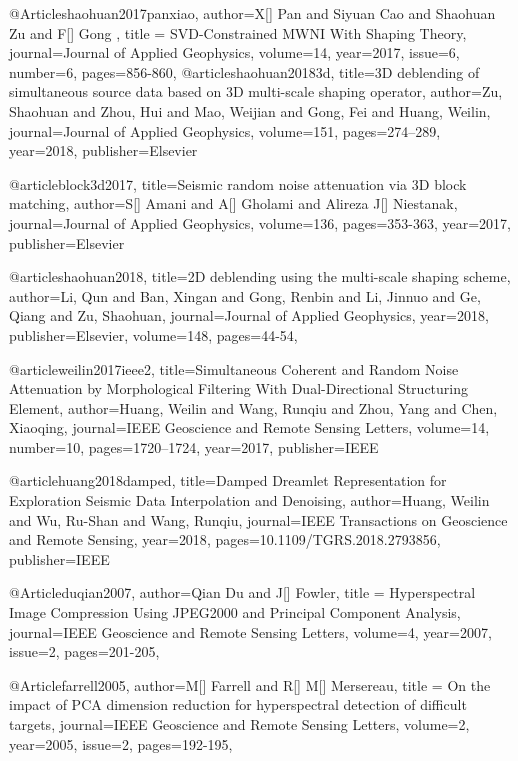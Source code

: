 @Article{shaohuan2017panxiao,
  author={X[] Pan and Siyuan Cao and Shaohuan Zu and F[] Gong },
  title = {SVD-Constrained MWNI With Shaping Theory},
  journal={Journal of Applied Geophysics},
  volume={14},
  year=2017,
  issue=6,
  number=6,
  pages={856-860},
}
@article{shaohuan20183d,
  title={3{D} deblending of simultaneous source data based on 3{D} multi-scale shaping operator},
  author={Zu, Shaohuan and Zhou, Hui and Mao, Weijian and Gong, Fei and Huang, Weilin},
  journal={Journal of Applied Geophysics},
  volume={151},
  pages={274--289},
  year={2018},
  publisher={Elsevier}
}

@article{block3d2017,
  title={Seismic random noise attenuation via 3{D} block matching},
  author={S[] Amani and A[] Gholami and Alireza J[] Niestanak},
  journal={Journal of Applied Geophysics},
  volume={136},
  pages={353-363},
  year={2017},
  publisher={Elsevier}
}






@article{shaohuan2018,
  title={2{D} deblending using the multi-scale shaping scheme},
  author={Li, Qun and Ban, Xingan and Gong, Renbin and Li, Jinnuo and Ge, Qiang and Zu, Shaohuan},
  journal={Journal of Applied Geophysics},
  year={2018},
  publisher={Elsevier},
 volume={148},
  pages={44-54},
}

@article{weilin2017ieee2,
  title={Simultaneous Coherent and Random Noise Attenuation by Morphological Filtering With Dual-Directional Structuring Element},
  author={Huang, Weilin and Wang, Runqiu and Zhou, Yang and Chen, Xiaoqing},
  journal={IEEE Geoscience and Remote Sensing Letters},
  volume={14},
  number={10},
  pages={1720--1724},
  year={2017},
  publisher={IEEE}
}

@article{huang2018damped,
  title={Damped Dreamlet Representation for Exploration Seismic Data Interpolation and Denoising},
  author={Huang, Weilin and Wu, Ru-Shan and Wang, Runqiu},
  journal={IEEE Transactions on Geoscience and Remote Sensing},
  year={2018},
  pages={10.1109/TGRS.2018.2793856},
  publisher={IEEE}
}


@Article{duqian2007,
  author={Qian Du and J[] Fowler},
  title = {Hyperspectral Image Compression Using JPEG2000 and Principal Component Analysis},
  journal={IEEE Geoscience and Remote Sensing Letters},
  volume={4},
  year=2007,
  issue=2,
  pages={201-205},
}

@Article{farrell2005,
  author={M[] Farrell and R[] M[] Mersereau},
  title = {On the impact of PCA dimension reduction for hyperspectral detection of difficult targets},
  journal={IEEE Geoscience and Remote Sensing Letters},
  volume={2},
  year=2005,
  issue=2,
  pages={192-195},
}




